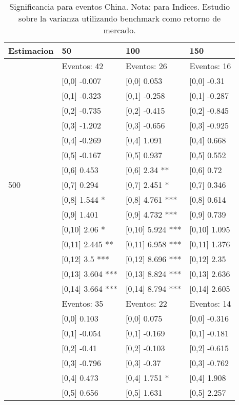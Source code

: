 \begin{table}

\caption{Significancia para eventos China. Nota: para Indices. Estudio sobre la varianza utilizando benchmark como retorno de mercado.}
\centering
\begin{tabular}[t]{llll}
\toprule
Estimacion & 50 & 100 & 150\\
\midrule
 & Eventos:  42 & Eventos:  26 & Eventos:  16\\
 & {}[0,0] -0.007 & {}[0,0] 0.053 & {}[0,0] -0.31\\
 & {}[0,1] -0.323 & {}[0,1] -0.258 & {}[0,1] -0.287\\
 & {}[0,2] -0.735 & {}[0,2] -0.415 & {}[0,2] -0.845\\
 & {}[0,3] -1.202 & {}[0,3] -0.656 & {}[0,3] -0.925\\
\addlinespace
 & {}[0,4] -0.269 & {}[0,4] 1.091 & {}[0,4] 0.668\\
 & {}[0,5] -0.167 & {}[0,5] 0.937 & {}[0,5] 0.552\\
 & {}[0,6] 0.453 & {}[0,6] 2.34 ** & {}[0,6] 0.72\\
500 & {}[0,7] 0.294 & {}[0,7] 2.451 * & {}[0,7] 0.346\\
 & {}[0,8] 1.544 * & {}[0,8] 4.761 *** & {}[0,8] 0.614\\
\addlinespace
 & {}[0,9] 1.401 & {}[0,9] 4.732 *** & {}[0,9] 0.739\\
 & {}[0,10] 2.06 * & {}[0,10] 5.924 *** & {}[0,10] 1.095\\
 & {}[0,11] 2.445 ** & {}[0,11] 6.958 *** & {}[0,11] 1.376\\
 & {}[0,12] 3.5 *** & {}[0,12] 8.696 *** & {}[0,12] 2.35\\
 & {}[0,13] 3.604 *** & {}[0,13] 8.824 *** & {}[0,13] 2.636\\
\addlinespace
 & {}[0,14] 3.664 *** & {}[0,14] 8.794 *** & {}[0,14] 2.605\\
 & Eventos:  35 & Eventos:  22 & Eventos:  14\\
 & {}[0,0] 0.103 & {}[0,0] 0.075 & {}[0,0] -0.316\\
 & {}[0,1] -0.054 & {}[0,1] -0.169 & {}[0,1] -0.181\\
 & {}[0,2] -0.41 & {}[0,2] -0.103 & {}[0,2] -0.615\\
\addlinespace
 & {}[0,3] -0.796 & {}[0,3] -0.37 & {}[0,3] -0.762\\
 & {}[0,4] 0.473 & {}[0,4] 1.751 * & {}[0,4] 1.908\\
 & {}[0,5] 0.656 & {}[0,5] 1.631 & {}[0,5] 2.257\\

\end{tabular}
\end{table}
